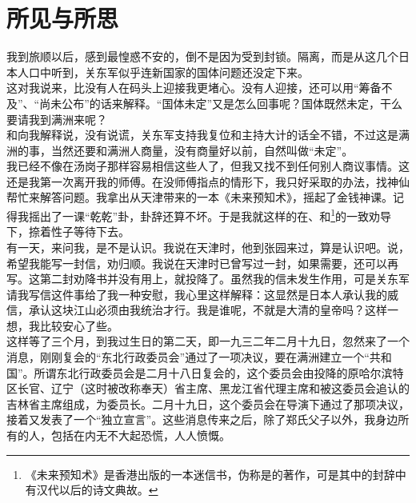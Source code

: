 \fancyhead[RO]{} %
\fancyhead[LE]{} %
\chapter*{所见与所思}
\thispagestyle{empty}
我到旅顺以后，感到最惶惑不安的，倒不是因为受到封锁。隔离，而是从这几个日本人口中听到，关东军似乎连新国家的国体问题还没定下来。\\

这对我说来，比没有人在码头上迎接我更堵心。没有人迎接，还可以用“筹备不及”、“尚未公布”的话来解释。“国体未定”又是怎么回事呢？国体既然未定，干么要请我到满洲来呢？\\

和向我解释说，没有说谎，关东军支持我复位和主持大计的话全不错，不过这是满洲的事，当然还要和满洲人商量，没有商量好以前，自然叫做“未定”。\\

我已经不像在汤岗子那样容易相信这些人了，但我又找不到任何别人商议事情。这还是我第一次离开我的师傅。在没师傅指点的情形下，我只好采取的办法，找神仙帮忙来解答问题。我拿出从天津带来的一本《未来预知术》，摇起了金钱神课。记得我摇出了一课“乾乾”卦，卦辞还算不坏。于是我就这样的在、和\footnote{《未来预知术》是香港出版的一本迷信书，伪称是的著作，可是其中的封辞中有汉代以后的诗文典故。}的一致劝导下，捺着性子等待下去。\\

有一天，来问我，是不是认识。我说在天津时，他到张园来过，算是认识吧。说，希望我能写一封信，劝归顺。我说在天津时已曾写过一封，如果需要，还可以再写。这第二封劝降书并没有用上，就投降了。虽然我的信未发生作用，可是关东军请我写信这件事给了我一种安慰，我心里这样解释：这显然是日本人承认我的威信，承认这块江山必须由我统治才行。我是谁呢，不就是大清的皇帝吗？这样一想，我比较安心了些。\\

这样等了三个月，到我过生日的第二天，即一九三二年二月十九日，忽然来了一个消息，刚刚复会的“东北行政委员会”通过了一项决议，要在满洲建立一个“共和国”。所谓东北行政委员会是二月十八日复会的，这个委员会由投降的原哈尔滨特区长官、辽宁（这时被改称奉天）省主席、黑龙江省代理主席和被这委员会追认的吉林省主席组成，为委员长。二月十九日，这个委员会在导演下通过了那项决议，接着又发表了一个“独立宣言”。这些消息传来之后，除了郑氏父子以外，我身边所有的人，包括在内无不大起恐慌，人人愤慨。\\

